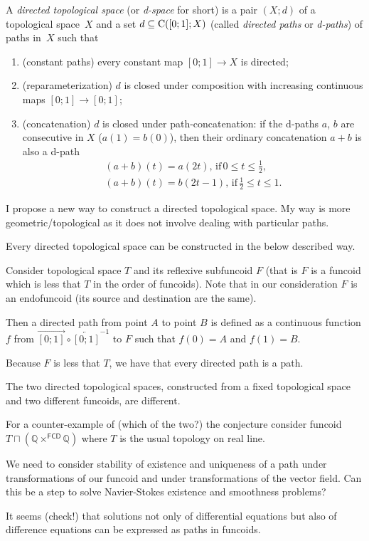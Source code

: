 \begin{defn}
A \emph{directed topological space} (or \emph{d-space} for short) is a pair $(X;d)$ of a topological space~$X$ and
a set $d\subseteq\mathrm{C}([0;1];X)$ (called \emph{directed paths} or \emph{d-paths}) of paths in~$X$ such that
\begin{enumerate}
\item (constant paths) every constant map $[0;1]\to X$ is directed;
\item (reparameterization) $d$ is closed under composition with increasing continuous maps $[0;1]\to [0;1]$;
\item (concatenation) $d$ is closed under path-concatenation: if the d-paths $a$, $b$ are consecutive in $X$ ($a(1)=b(0)$), then their ordinary concatenation $a+b$ is also a d-path
\begin{gather*}
(a+b)(t) = a(2t),\,\text{if}\, 0\le t\le \frac{1}{2}, \\
(a+b)(t) = b(2t-1),\,\text{if}\, \frac{1}{2}\le t\le 1.
\end{gather*}
\end{enumerate}
\end{defn}

I propose a new way to construct a directed topological space. My way is more geometric/topological as it does not involve dealing with particular paths.

\begin{conjecture}
Every directed topological space can be constructed in the below described way.
\end{conjecture}

Consider topological space $T$ and its reflexive subfuncoid $F$ (that is $F$ is a funcoid which is less that $T$ in the order of funcoids).
Note that in our consideration $F$ is an endofuncoid (its source and destination are the same).

Then a directed path from point $A$ to point $B$ is defined as a continuous function $f$ from
$\overrightarrow{[0;1]}\circ\overleftarrow{[0;1]}^{-1}$ to $F$ such that $f(0)=A$ and $f(1)=B$.

Because $F$ is less that $T$, we have that every directed path is a path.

\begin{conjecture}
The two directed topological spaces, constructed from a fixed topological space and two different funcoids,
are different.
\end{conjecture}

For a counter-example of (which of the two?) the conjecture consider funcoid $T\sqcap(\mathbb{Q}\times^{\mathsf{FCD}}\mathbb{Q})$
where $T$ is the usual topology on real line.

We need to consider stability of existence and uniqueness of a path under transformations of our funcoid and
under transformations of the vector field. Can this be a step to solve Navier-Stokes existence and smoothness problems?

It seems (check!) that solutions not only of differential equations but also of difference equations can be
expressed as paths in funcoids.